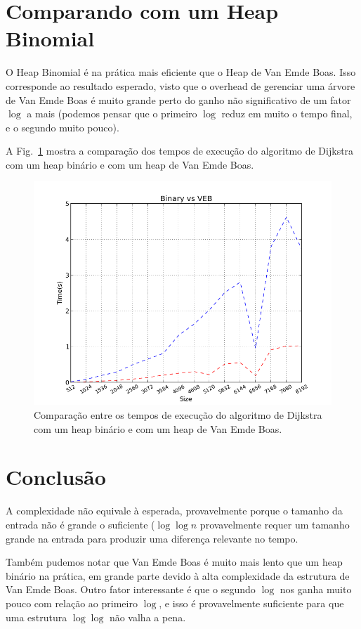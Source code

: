 \documentclass{article}
\begin{document}
\section{Comparando com um Heap Binomial}
O Heap Binomial é na prática mais eficiente que o Heap de Van Emde Boas. Isso corresponde ao resultado esperado, visto que o overhead de gerenciar uma árvore de Van Emde Boas é muito grande perto do ganho não significativo de um fator $\log$ a mais (podemos pensar que o primeiro $\log$ reduz em muito o tempo final, e o segundo muito pouco).

A Fig.~\ref{fig5} mostra a comparação dos tempos de execução do algoritmo de Dijkstra com um heap binário e com um heap de Van Emde Boas.


\begin{figure}
  \centering
  \includegraphics[width=\textwidth,keepaspectratio]{ex1_ex2.png}
  \caption {Comparação entre os tempos de execução do algoritmo de Dijkstra com um heap binário e com um heap de Van Emde Boas.}
  \label{fig5}
\end{figure}


\section{Conclusão}

A complexidade não equivale à esperada, provavelmente porque o tamanho da entrada não é grande o suficiente ($\log\log n$ provavelmente requer um tamanho grande na entrada para produzir uma diferença relevante no tempo.

Também pudemos notar que Van Emde Boas é muito mais lento que um heap binário na prática, em grande parte devido à alta complexidade da estrutura de Van Emde Boas. Outro fator interessante é que o segundo $\log$ nos ganha muito pouco com relação ao primeiro $\log$, e isso é provavelmente suficiente para que uma estrutura $\log\log$ não valha a pena.

\printbibliography
\end{document}
